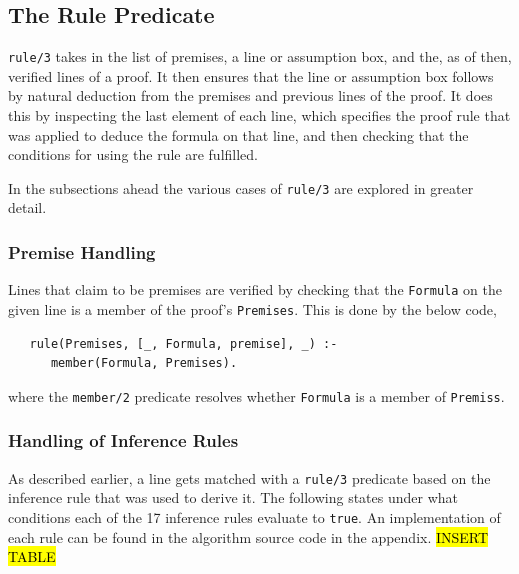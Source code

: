\documentclass[a4paper, 11pt]{article}
\begin{document}
   \subsection{The Rule Predicate}
   \texttt{rule/3} takes in the list of premises, a
   line or assumption box, and the, as of then, 
   verified lines of a proof. It then ensures that
   the line or assumption box follows by natural
   deduction from the premises and previous lines of
   the proof. It does this by inspecting the last
   element of each line, which specifies the
   proof rule that was applied to deduce the
   formula on that line, and then checking that the
   conditions for using the rule are fulfilled.
   \bigbreak

   In the subsections ahead the various cases of
   \texttt{rule/3} are explored in greater detail.

   \subsubsection{Premise Handling}
   \label{premise-handling}
   Lines that claim to be premises are verified by checking
   that the \texttt{Formula} on the given line is a member of 
   the proof's \texttt{Premises}. This is done by the below
   code, 
   
\begin{verbatim}
   rule(Premises, [_, Formula, premise], _) :-
      member(Formula, Premises).
\end{verbatim}

   where the \texttt{member/2} predicate resolves
   whether \texttt{Formula} is a member of \texttt{Premiss}. 

   \subsubsection{Handling of Inference Rules}
   \label{handling-of-inference-rules}

   As described earlier, a line gets matched with a 
   \texttt{rule/3} predicate based on the inference rule that 
   was used to derive it. The following states under what
   conditions each of the 17 inference rules evaluate to
   \texttt{true}. An implementation of each rule can be found
   in the algorithm source code in the appendix.
   \bigbreak
   \hl{INSERT TABLE}
\end{document}
